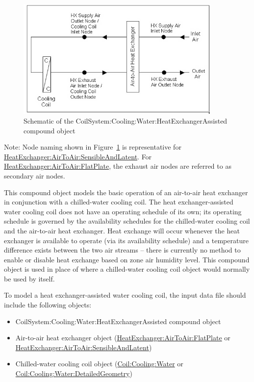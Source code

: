 \begin{figure}[hbtp] %
\centering
\includegraphics[width=0.9\textwidth, height=0.9\textheight, keepaspectratio=true]{media/image370.png}
\caption{Schematic of the CoilSystem:Cooling:Water:HeatExchangerAssisted compound object \protect \label{fig:schematic-of-the-coilsystem-cooling-water}}
\end{figure}

Note: Node naming shown in Figure~\ref{fig:schematic-of-the-coilsystem-cooling-water} is representative for \hyperref[heatexchangerairtoairsensibleandlatent]{HeatExchanger:AirToAir:SensibleAndLatent}. For \hyperref[heatexchangerairtoairflatplate]{HeatExchanger:AirToAir:FlatPlate}, the exhaust air nodes are referred to as secondary air nodes.

This compound object models the basic operation of an air-to-air heat exchanger in conjunction with a chilled-water cooling coil. The heat exchanger-assisted water cooling coil does not have an operating schedule of its own; its operating schedule is governed by the availability schedules for the chilled-water cooling coil and the air-to-air heat exchanger. Heat exchange will occur whenever the heat exchanger is available to operate (via its availability schedule) and a temperature difference exists between the two air streams -- there is currently no method to enable or disable heat exchange based on zone air humidity level. This compound object is used in place of where a chilled-water cooling coil object would normally be used by itself.

To model a heat exchanger-assisted water cooling coil, the input data file should include the following objects:

\begin{itemize}
\item
  CoilSystem:Cooling:Water:HeatExchangerAssisted compound object
\item
  Air-to-air heat exchanger object (\hyperref[heatexchangerairtoairflatplate]{HeatExchanger:AirToAir:FlatPlate} or \hyperref[heatexchangerairtoairsensibleandlatent]{HeatExchanger:AirToAir:SensibleAndLatent})
\item
  Chilled-water cooling coil object (\hyperref[coilcoolingwater]{Coil:Cooling:Water} or \hyperref[coilcoolingwaterdetailedgeometry]{Coil:Cooling:Water:DetailedGeometry})
\end{itemize}

